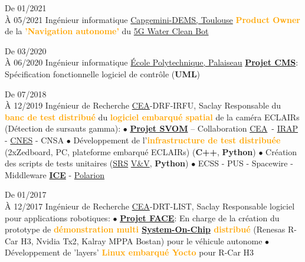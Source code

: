 \documentclass[
	a4paper,
	subsectioncolor=cvblue!70,
]{fortysecondscv}
\newcommand{\cea}{\href{http://www.cea.fr/}{CEA}}
\newcommand{\hl}[1]{\textbf{\textcolor{orange}{#1}}}
\begin{document}
\begin{cvtable}[2]
  \cvitem
      {De 01/2021\\À 05/2021}
      {Ingénieur informatique}
      {\href{https://www.capgemini.com/service/digital-services/digital-engineering-and-manufacturing-services/}{Capgemini-DEMS,
      Toulouse}}
  {
    \hl{Product Owner} de la \hl{'Navigation autonome'} du
    \href{https://www.capgemini.com/fr-fr/solutions/5g-water-clean-bot/}{5G
      Water Clean Bot}
  }

  \cvitem
      {De 03/2020\\À 06/2020}
      {Ingénieur informatique}
      {\href{https://www.polytechnique.edu/fr/le-laboratoire-leprince-ringuet-llr}{École
      Polytechnique, Palaiseau}}
  {
    \textbf{\href{http://polywww.in2p3.fr/-cms-45-?lang=fr}{Projet CMS}}:
    Spécification fonctionnelle logiciel de contrôle (\textbf{UML})
  }

  \cvitem
      {De 07/2018\\À 12/2019}
      {Ingénieur de Recherche}
      {\cea-DRF-IRFU, Saclay}
  {
    Responsable du \hl{banc de test distribué} du \hl{logiciel embarqué spatial} de la
    caméra ECLAIRs (Détection de sursauts gamma):
    \newline $\bullet$ {
      \hl{\href{http://www.svom.fr/}{Projet SVOM}} -- Collaboration
      \cea\ - \href{http://www.irap.omp.eu/}{IRAP} -
      \href{https://cnes.fr/fr}{CNES} - CNSA
    }
    \newline $\bullet$ {
      Développement de l'\hl{infrastructure de test distribuée} (2xZedboard, PC,
      plateforme embarqué ECLAIRs) (\textbf{C++}, \textbf{Python})
    }
    \newline $\bullet$ {
      Création des scripts de tests unitaires
      (\href{https://en.wikipedia.org/wiki/Software_requirements_specification}{SRS}
      \href{https://en.wikipedia.org/wiki/Software_verification_and_validation}{V\&V},
      \textbf{Python})
    }
    \newline $\bullet$ {
      ECSS - PUS - Spacewire - Middleware
      \href{https://zeroc.com/products/ice}{\textbf{ICE}} -
      \href{https://www.plm.automation.siemens.com/global/en/products/polarion/}{Polarion}
    }
  }

  \cvitem
      {De 01/2017\\À 12/2017}
      {Ingénieur de Recherche}
      {\cea-DRT-LIST, Saclay}
  {
    Responsable logiciel pour applications robotiques:
    \newline $\bullet$ {
      \textbf{\href{https://www.designspot.fr/portfolio/face/}{Projet FACE}}: En
      charge de la création du prototype de \hl{démonstration multi
        \href{https://en.wikipedia.org/wiki/System_on_a_chip}{System-On-Chip}
        distribué} (Renesas R-Car H3, Nvidia Tx2, Kalray MPPA Bostan) pour
      le véhicule autonome
    }
    \newline $\bullet$ {
      Développement de 'layers' \hl{Linux embarqué Yocto} pour R-Car H3
    }
  }


\end{cvtable}
\end{document}
